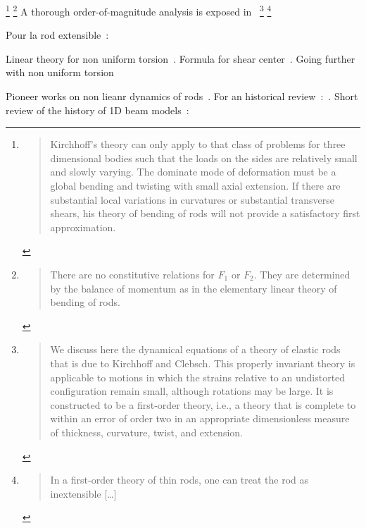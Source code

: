 \footnote{\blockcquote[p.~18]{Dill1992}{Kirchhoff's theory can only apply to that class of problems for three dimensional bodies such that the loads on the sides are relatively small and slowly varying. The dominate mode of deformation must be a global bending and twisting with small axial extension. If there are substantial local variations in curvatures or substantial transverse shears, his theory of bending of rods will not provide a satisfactory first approximation.}}
\footnote{\blockcquote[p.~15]{Dill1992}{There are no constitutive relations for $F_1$ or $F_2$. They are determined by the balance of momentum as in the elementary linear theory of bending of rods.}}
A thorough order-of-magnitude analysis is exposed in~\cite{Dill1992, Coleman1993}
\footnote{\blockcquote[p.~1]{Coleman1993}{We discuss here the dynamical equations of a theory of elastic rods that is due to Kirchhoff and Clebsch. This properly invariant theory is applicable to motions in which the strains relative to an undistorted configuration remain small, although rotations may be large. It is constructed to be a first-order theory, i.e., a theory that is complete to within an error of order two in an appropriate dimensionless measure of thickness, curvature, twist, and extension.}}
\footnote{\blockcquote[p.~1]{Coleman1993}{In a first-order theory of thin rods, one can treat the rod as inextensible [\dots]}}


Pour la rod extensible~:~\cite{Cisternas2002}

Linear theory for non uniform torsion~\cite{Vlasov1961}. Formula for shear center~\cite{Elter1984}. Going further with non uniform torsion~\cite{Alves2014}

Pioneer works on non lieanr dynamics of rods~\cite{Weiss2002}. For an historical review~:~\cite{Benvenuto1991a}. Short review of the history of 1D beam models~:\cite[p.~243]{Antman2005}



